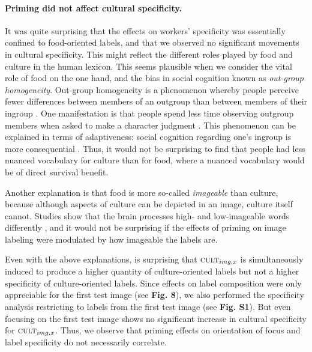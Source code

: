 \documentclass[a4paper]{report}
\begin{document}
\paragraph{Priming did not affect cultural specificity.}
It was quite surprising that the effects on workers' specificity was 
essentially
confined to food-oriented labels, and that we observed no significant movements
in cultural specificity.   This might reflect the different roles
played by food and culture in the human lexicon.  This seems plausible when we 
consider the vital role of food on the one hand, and the bias in social 
cognition known as \textit{out-group homogeneity}\cite{Vala2012491,Ray2012387,Ishii2011159,Boldry2007157}.
Out-group homogeneity is a phenomenon whereby people perceive fewer 
differences between members of an outgroup than between members of their 
ingroup \cite{Boldry2007157}.  One manifestation is that people 
spend less time observing outgroup members when asked to make a character 
judgment \cite{Vala2012491}.  This phenomenon can be explained in terms of 
adaptiveness: social cognition regarding one's ingroup is more consequential
\cite{Vala2012491}.  Thus, it would not be surprising to find that people had 
less nuanced vocabulary for culture than for food, where a nuanced vocabulary 
would be of direct survival benefit.

Another explanation is that food is more so-called \textit{imageable} than 
culture, because although aspects of culture can be depicted in an image,
culture itself cannot.  Studies show that the brain processes high- and 
low-imageable words differently \cite{Swaab200299}, and it would not be 
surprising if the effects of priming on image labeling were modulated by how 
imageable the labels are.

Even with the above explanations, is surprising that 
$\textsc{cult}_{img,x}$ is simultaneously induced to 
produce a higher quantity of culture-oriented labels but not a higher
specificity of culture-oriented labels.  Since effects on 
label composition were only appreciable for the first test image 
(see \textbf{Fig. 8}), we also
performed the specificity analysis restricting to labels from the first
test image (see \textbf{Fig. S1}).  But even focusing on the first test image
shows no significant increase in cultural specificity for 
$\textsc{cult}_{img,x}$.  Thus, we observe that priming effects on 
orientation of focus and label specificity do not necessarily correlate.
\end{document}
